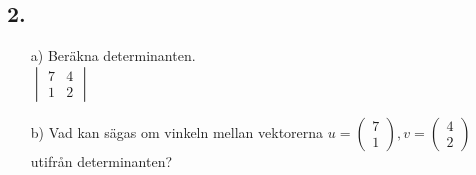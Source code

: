 \documentclass{article}
\begin{document}
\subsection*{2.}
\begin{itemize}
    \item[a) ]	Beräkna determinanten.
				\newline
				\\
				$ 
    			\begin{vmatrix}
   		 		7  & 4 \\
  		  		1  & 2
		    	\end{vmatrix}
  			  	$
    \item[b) ]	Vad kan sägas om vinkeln mellan vektorerna 
    			$
    			u =   			  
				\begin{pmatrix}
   		 		7  \\
  		  		1  
		    	\end{pmatrix}  		
		    	,
		    	v =   			  
				\begin{pmatrix}
   		 		4  \\
  		  		2  
		    	\end{pmatrix}  			
		    	$ 
		    	utifrån determinanten?
\end{itemize}
\end{document}
